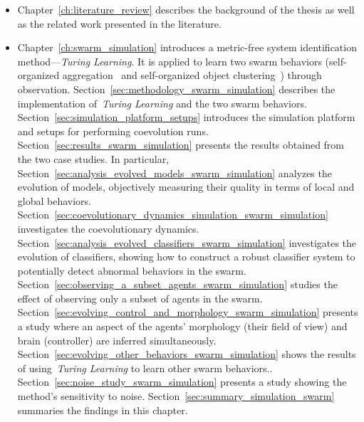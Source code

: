 \begin{itemize}
\item Chapter~\ref{ch:literature_review} describes the background of the thesis as well as the related work presented in the literature. 

\item Chapter~\ref{ch:swarm_simulation} introduces a metric-free system identification method---\textit{Turing Learning}. It is applied to learn two swarm behaviors (self-organized aggregation~\cite{Gauci2014_ijrr} and self-organized object clustering~\cite{Melvin2014_aamas}) through observation. Section~\ref{sec:methodology_swarm_simulation} describes the implementation of~\textit{Turing Learning} and the two swarm behaviors. Section~\ref{sec:simulation_platform_setups} introduces the simulation platform and setups for performing coevolution runs. Section~\ref{sec:results_swarm_simulation} presents the results obtained from the two case studies. In particular, Section~\ref{sec:analysis_evolved_models_swarm_simulation} analyzes the evolution of models, objectively measuring their quality in terms of local and global behaviors. Section~\ref{sec:coevolutionary_dynamics_simulation_swarm_simulation} investigates the coevolutionary dynamics. Section~\ref{sec:analysis_evolved_classifiers_swarm_simulation} investigates the evolution of classifiers, showing how to construct a robust classifier system to potentially detect abnormal behaviors in the swarm. Section~\ref{sec:observing_a_subset_agents_swarm_simulation} studies the effect of observing only a subset of agents in the swarm. Section~\ref{sec:evolving_control_and_morphology_swarm_simulation} presents a study where an aspect of the agents' morphology (their field of view) and brain (controller) are inferred simultaneously. Section~\ref{sec:evolving_other_behaviors_swarm_simulation} shows the results of using~\textit{Turing Learning} to learn other swarm behaviors.. Section~\ref{sec:noise_study_swarm_simulation} presents a study showing the method's sensitivity to noise. Section~\ref{sec:summary_simulation_swarm} summaries the findings in this chapter.


\end{itemize}
